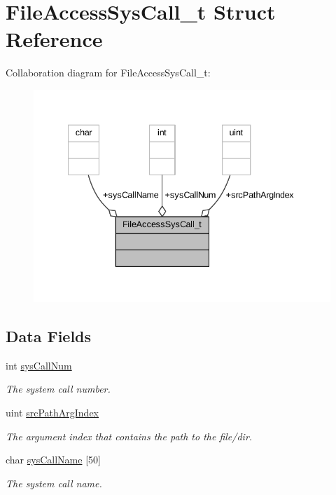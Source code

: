 \hypertarget{struct_file_access_sys_call__t}{}\section{File\+Access\+Sys\+Call\+\_\+t Struct Reference}
\label{struct_file_access_sys_call__t}


Collaboration diagram for File\+Access\+Sys\+Call\+\_\+t\+:
\nopagebreak
\begin{figure}[H]
\begin{center}
\leavevmode
\includegraphics[width=340pt]{struct_file_access_sys_call__t__coll__graph}
\end{center}
\end{figure}
\subsection*{Data Fields}
\begin{DoxyCompactItemize}
\item 
int \hyperlink{struct_file_access_sys_call__t_aac77377eb1268f38928c6c10a863108c}{sys\+Call\+Num}
\begin{DoxyCompactList}\small\item\em The system call number. \end{DoxyCompactList}\item 
uint \hyperlink{struct_file_access_sys_call__t_a369352cb21edd042835678d86a903153}{src\+Path\+Arg\+Index}
\begin{DoxyCompactList}\small\item\em The argument index that contains the path to the file/dir. \end{DoxyCompactList}\item 
char \hyperlink{struct_file_access_sys_call__t_a6d42ef87418c0fb89d51511e8b7494b4}{sys\+Call\+Name} \mbox{[}50\mbox{]}
\begin{DoxyCompactList}\small\item\em The system call name. \end{DoxyCompactList}\end{DoxyCompactItemize}


